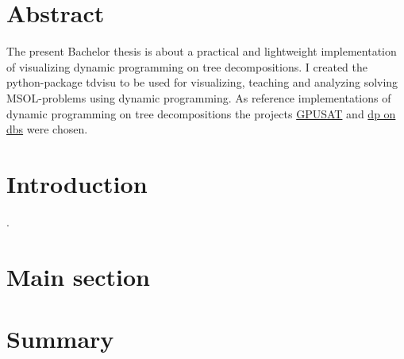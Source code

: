 \documentclass[a4paper, 12pt]{scrartcl}
\begin{document}
\begin{titlepage}
	\begin{center}
		
	\end{center}
\end{titlepage}

\tableofcontents

\newpage

\section{Abstract}
\vspace{4ex}
The present Bachelor thesis is about a practical and lightweight implementation of visualizing dynamic programming on tree decompositions.
I created the python-package tdvisu to be used for visualizing, teaching and analyzing solving MSOL-problems using dynamic programming.
As reference implementations of dynamic programming on tree decompositions the projects \href{https://github.com/daajoe/GPUSAT}{GPUSAT} and \href{https://github.com/hmarkus/dp_on_dbs}{dp on dbs} were chosen.

\newpage


\section{Introduction}

\newpage.
\section{Main section}


\section{Summary}

{}

\end{document}
